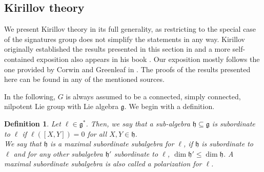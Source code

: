 \documentclass[pdflatex,sn-mathphys-num]{sn-jnl}
\theoremstyle{thmstyletwo}
\newtheorem{definition}{Definition}[section]
\theoremstyle{thmstyleone}
\theoremstyle{thmstyletwo}
\newtheorem{example}[definition]{Example}
\newcommand{\fancyh}{\mathfrak{h}}
\newcommand{\fancyg}{\mathfrak{g}}
\newcommand{\rdbracket}{[\mathbb{R}^d]}
\begin{document}
	\subsection{Kirillov theory}\label{sec: kirillov theory}
	We present Kirillov theory in its full generality, as restricting to the special case of the signatures group does not simplify the statements in any way. Kirillov originally established the results presented in this section in \cite{kirillov1962unitary} and a more self-contained exposition also appears in his book \cite{kirillov2004lectures}. Our exposition mostly follows the one provided by Corwin and Greenleaf in \cite{corwin1990representations}. The proofs of the results presented here can be found in any of the mentioned sources.
	
	In the following, $G$ is always assumed to be a connected, simply connected, nilpotent Lie group with Lie algebra $\fancyg$. We begin with a definition.
	\begin{definition}
		Let $\ell \in \mathfrak{g}^*$. Then, we say that a sub-algebra $\mathfrak{h} \subseteq{\mathfrak{g}}$ is subordinate to $\ell$ if $\ell([X,Y]) = 0$ for all $X,Y \in \mathfrak{h}$.\\
		We say that $\mathfrak{h}$ is a maximal subordinate subalgebra for $\ell$, if $\mathfrak{h}$ is subordinate to $\ell$ and for any other subalgebra $\mathfrak{h}'$ subordinate to $\ell$, $\operatorname{dim}\fancyh ' \leq \operatorname{dim}\fancyh$. A maximal subordinate subalgebra is also called a \textit{polarization} for $\ell$. 
	\end{definition}
\end{document}
